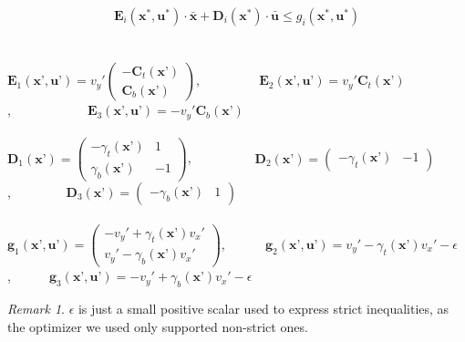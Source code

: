 \documentclass[12,twoside]{TFG-GM}
\theoremstyle{definition}
\theoremstyle{remark}
\newtheorem{remark}[theorem]{Remark}
\newcommand*\diff[1]{\bar{#1}}
\begin{document}
\begin{equation} \label{eq:condensed_cone_linear}
\textbf{E}_i(\textbf{x}^*, \textbf{u}^*)\cdot \diff{\textbf{x}} + \textbf{D}_i(\textbf{x}^*)\cdot \diff{\textbf{u}} \leq g_i(\textbf{x}^*, \textbf{u}^*)
\end{equation} \\ \\
$\textbf{E}_1(\textbf{x'}, \textbf{u'}) = v_y' \begin{pmatrix}
-\textbf{C}_t(\textbf{x'}) \\
\textbf{C}_b(\textbf{x'})
\end{pmatrix}$,\,\,\,\,\,\,\,\,\,\,\,\,\,\,\,\,\,\,\,\,\,\,\,\,\,\, $\textbf{E}_2(\textbf{x'}, \textbf{u'}) = v_y' \textbf{C}_t(\textbf{x'})$,\,\,\,\,\,\,\,\,\,\,\,\,\,\,\,\,\,\,\,\,\,\,\,\,\,\,\,\,\,\,\,\,\,\, $\textbf{E}_3(\textbf{x'}, \textbf{u'}) = -v_y' \textbf{C}_b(\textbf{x'})$ \\ \\
$\textbf{D}_1(\textbf{x'}) = \begin{pmatrix}
-\gamma_t(\textbf{x'}) & 1 \\
\gamma_b(\textbf{x'}) & -1
\end{pmatrix}$,\,\,\,\,\,\,\,\,\,\,\,\,\,\,\,\,\,\,\,\,\,\,\,\,\,\,\,\, $\textbf{D}_2(\textbf{x'}) = \begin{pmatrix}
-\gamma_t(\textbf{x'}) & -1
\end{pmatrix}$,\,\,\,\,\,\,\,\,\,\,\,\,\,\,\,\,\,\,\,\,\,\,\,\, $\textbf{D}_3(\textbf{x'}) = \begin{pmatrix}
-\gamma_b(\textbf{x'}) & 1
\end{pmatrix}$ \\ \\
$\textbf{g}_1(\textbf{x'}, \textbf{u'}) = \begin{pmatrix}
-v_y' + \gamma_t(\textbf{x'}) v_x'\\
 v_y' - \gamma_b(\textbf{x'}) v_x'
\end{pmatrix}$,\,\,\,\,\,\,\,\,\,\,\,\,\,\,\,\,\, $\textbf{g}_2(\textbf{x'}, \textbf{u'}) = v_y' - \gamma_t(\textbf{x'}) v_x' - \epsilon$,\,\,\,\,\,\,\,\,\,\,\,\,\,\,\,\, $\textbf{g}_3(\textbf{x'}, \textbf{u'}) = -v_y' + \gamma_b(\textbf{x'}) v_x' - \epsilon$ \\

\begin{remark}
$\epsilon$ is just a small positive scalar used to express strict inequalities, as the optimizer we used only supported non-strict ones.
\end{remark}
\end{document}
